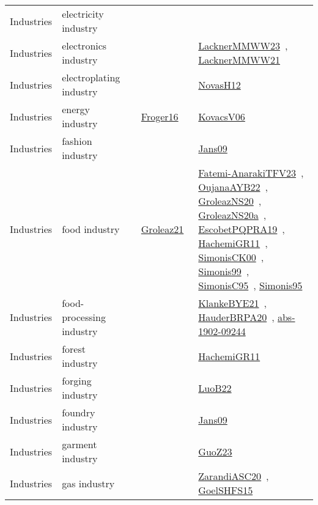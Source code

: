 {\begin{longtable}{lp{3cm}>{\raggedright\arraybackslash}p{6cm}>{\raggedright\arraybackslash}p{6cm}>{\raggedright\arraybackslash}p{8cm}}
Industries & electricity industry &  &  & \\
Industries & electronics industry &  &  & \href{../works/LacknerMMWW23.pdf}{LacknerMMWW23}~\cite{LacknerMMWW23}, \href{../works/LacknerMMWW21.pdf}{LacknerMMWW21}~\cite{LacknerMMWW21}\\
Industries & electroplating industry &  &  & \href{../works/NovasH12.pdf}{NovasH12}~\cite{NovasH12}\\
Industries & energy industry &  & \href{../works/Froger16.pdf}{Froger16}~\cite{Froger16} & \href{../works/KovacsV06.pdf}{KovacsV06}~\cite{KovacsV06}\\
Industries & fashion industry &  &  & \href{../works/Jans09.pdf}{Jans09}~\cite{Jans09}\\
Industries & food industry &  & \href{../works/Groleaz21.pdf}{Groleaz21}~\cite{Groleaz21} & \href{../works/Fatemi-AnarakiTFV23.pdf}{Fatemi-AnarakiTFV23}~\cite{Fatemi-AnarakiTFV23}, \href{../works/OujanaAYB22.pdf}{OujanaAYB22}~\cite{OujanaAYB22}, \href{../works/GroleazNS20.pdf}{GroleazNS20}~\cite{GroleazNS20}, \href{../works/GroleazNS20a.pdf}{GroleazNS20a}~\cite{GroleazNS20a}, \href{../works/EscobetPQPRA19.pdf}{EscobetPQPRA19}~\cite{EscobetPQPRA19}, \href{../works/HachemiGR11.pdf}{HachemiGR11}~\cite{HachemiGR11}, \href{../works/SimonisCK00.pdf}{SimonisCK00}~\cite{SimonisCK00}, \href{../works/Simonis99.pdf}{Simonis99}~\cite{Simonis99}, \href{../works/SimonisC95.pdf}{SimonisC95}~\cite{SimonisC95}, \href{../works/Simonis95.pdf}{Simonis95}~\cite{Simonis95}\\
Industries & food-processing industry &  &  & \href{../works/KlankeBYE21.pdf}{KlankeBYE21}~\cite{KlankeBYE21}, \href{../works/HauderBRPA20.pdf}{HauderBRPA20}~\cite{HauderBRPA20}, \href{../works/abs-1902-09244.pdf}{abs-1902-09244}~\cite{abs-1902-09244}\\
Industries & forest industry &  &  & \href{../works/HachemiGR11.pdf}{HachemiGR11}~\cite{HachemiGR11}\\
Industries & forging industry &  &  & \href{../works/LuoB22.pdf}{LuoB22}~\cite{LuoB22}\\
Industries & foundry industry &  &  & \href{../works/Jans09.pdf}{Jans09}~\cite{Jans09}\\
Industries & garment industry &  &  & \href{../works/GuoZ23.pdf}{GuoZ23}~\cite{GuoZ23}\\
Industries & gas industry &  &  & \href{../works/ZarandiASC20.pdf}{ZarandiASC20}~\cite{ZarandiASC20}, \href{../works/GoelSHFS15.pdf}{GoelSHFS15}~\cite{GoelSHFS15}\\

\end{longtable}}
